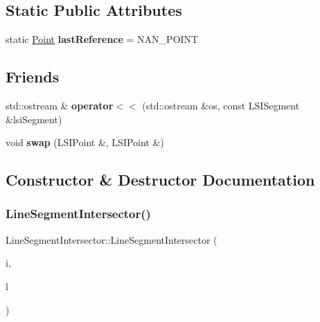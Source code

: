 \subsection*{Static Public Attributes}
\begin{DoxyCompactItemize}
\item 
\mbox{\label{classLineSegmentIntersector_a170c7914f53e24387e8e46cedf3a1290}} 
static \hyperlink{classPoint}{Point} {\bfseries last\+Reference} = N\+A\+N\+\_\+\+P\+O\+I\+NT
\end{DoxyCompactItemize}
\subsection*{Friends}
\begin{DoxyCompactItemize}
\item 
\mbox{\label{classLineSegmentIntersector_ac30b368f45ebad37982a7529f590c24d}} 
std\+::ostream \& {\bfseries operator$<$$<$} (std\+::ostream \&os, const L\+S\+I\+Segment \&lsi\+Segment)
\item 
\mbox{\label{classLineSegmentIntersector_aa1641902c18c0376d0303883d4e759e5}} 
void {\bfseries swap} (L\+S\+I\+Point \&, L\+S\+I\+Point \&)
\end{DoxyCompactItemize}


\subsection{Constructor \& Destructor Documentation}
\mbox{\label{classLineSegmentIntersector_abfe17083938ad4ee705fbe7d0051f209}} 
\subsubsection{\texorpdfstring{Line\+Segment\+Intersector()}{LineSegmentIntersector()}}
{\footnotesize\ttfamily Line\+Segment\+Intersector\+::\+Line\+Segment\+Intersector (\begin{DoxyParamCaption}\item[{std\+::vector$<$ \hyperlink{classLineSegment}{Line\+Segment} $>$ \&}]{i,  }\item[{\hyperlink{classLSIGraphix}{L\+S\+I\+Graphix} \&}]{l }\end{DoxyParamCaption})}


